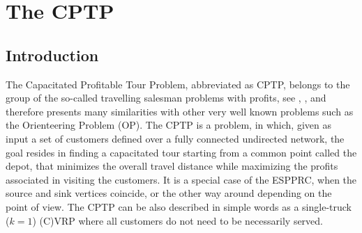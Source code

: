\chapter{The CPTP}
\label{sec:cptp-chapter}

\section{Introduction}
\label{sec:cptp-intro}

The Capacitated Profitable Tour Problem, abbreviated as CPTP,
belongs to the group of the so-called travelling salesman
problems with profits, see \cite{dellamico1995}, \cite{feillet2005a},
and therefore presents many similarities with other very well known
problems such as the Orienteering Problem (OP).
The CPTP is a problem, in which, given as input a set of customers
defined over a fully connected undirected network, the goal resides in finding
a capacitated tour starting from a common point called the depot,
that minimizes the overall travel distance while maximizing
the profits associated in visiting the customers.
It is a special case of the ESPPRC, when the source and sink vertices coincide,
or the other way around depending on the point of view.
The CPTP can be also described in simple words
as a single-truck ($k = 1$) (C)VRP where all customers
do not need to be necessarily served.


